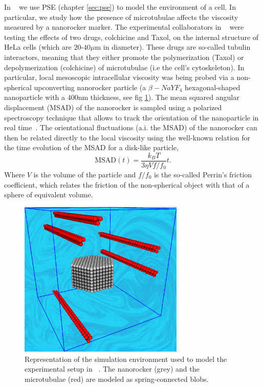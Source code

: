\documentclass[ twoside,openright,titlepage,numbers=noenddot,%
headinclude,footinclude,cleardoublepage=empty,abstract=on,
BCOR=5mm,paper=b5,fontsize=11pt, dvipsnames
]{scrreprt}
\newcommand{\kT}{k_B T}
\begin{document}
In ~\cite{Pelaez2019} we use \gls{PSE} (chapter \ref{sec:pse}) to model the environment of a cell. In particular, we study how the presence of microtubulae affects the viscosity measured by a nanorocker marker.
The experimental collaborators in ~\cite{Pelaez2019} were testing the effects of two drugs, colchicine and Taxol, on the internal structure of HeLa cells (which are $20$-$40\mu$m in diameter). These drugs are so-called tubulin interactors, meaning that they either promote the polymerization (Taxol) or depolymerization (colchicine) of microtubulae (i.e the cell's cytoskeleton).
In particular, local mesoscopic intracellular viscosity was being probed via a non-spherical upconverting nanorocker particle (a $\beta-NaYF_4$ hexagonal-shaped nanoparticle with a $400$nm thickness, see fig \ref{fig:cellvis}). The mean squared angular displacement (MSAD) of the nanorocker is sampled using a polarized spectroscopy technique that allows to track the orientation of the nanoparticle in real time~\cite{RodriguezSevilla2016}.
The orientational fluctuations (a.i. the MSAD) of the nanorocker can then be related directly to the local viscosity using the well-known relation for the time evolution of the MSAD for a disk-like particle,
\begin{equation}
  \label{eq:msad}
  \text{MSAD}(t) = \frac{\kT}{3\eta V f/f_0}t.
\end{equation}
Where $V$ is the volume of the particle and $f/f_0$ is the so-called Perrin's friction coefficient, which relates the friction of the non-spherical object with that of a sphere of equivalent volume. 
\begin{figure}[H]
  \centering
  \includegraphics[width=0.7\textwidth]{gfx/hexagon}
  \caption{Representation of the simulation environment used to model the experimental setup in ~\cite{Pelaez2019}. The nanorocker (grey) and the microtubulae (red) are modeled as spring-connected blobs.}
  \label{fig:cellvis}
\end{figure}
\end{document}
